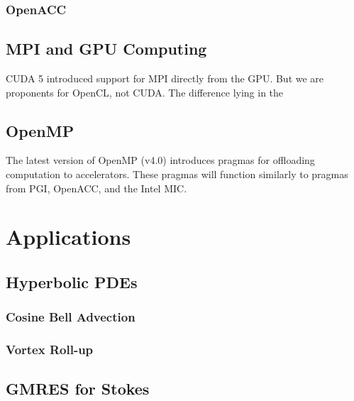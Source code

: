 \documentclass{report}
\begin{document}
\subsection{OpenACC}




\section{MPI and GPU Computing}

CUDA 5 introduced support for MPI directly from the GPU. But we are proponents for OpenCL, not CUDA. The difference lying in the 


\section{OpenMP}
The latest version of OpenMP (v4.0) introduces pragmas for offloading computation to accelerators. These pragmas will function similarly to pragmas from PGI, OpenACC, and the Intel MIC. 


\chapter{Applications}
\label{chap:applications}

\section{Hyperbolic PDEs}
\subsection{Cosine Bell Advection}
\subsection{Vortex Roll-up}

\section{GMRES for Stokes}



\ifstandalone


\end{document}
